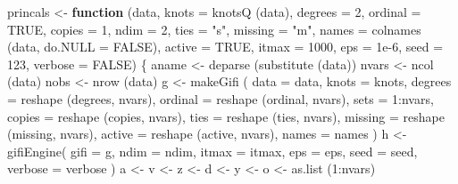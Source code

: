 \documentclass[
  12pt,
]{book}
\newenvironment{Shaded}{\begin{snugshade}}{\end{snugshade}}
\newcommand{\AttributeTok}[1]{\textcolor[rgb]{0.77,0.63,0.00}{#1}}
\newcommand{\ConstantTok}[1]{\textcolor[rgb]{0.00,0.00,0.00}{#1}}
\newcommand{\ControlFlowTok}[1]{\textcolor[rgb]{0.13,0.29,0.53}{\textbf{#1}}}
\newcommand{\DecValTok}[1]{\textcolor[rgb]{0.00,0.00,0.81}{#1}}
\newcommand{\FloatTok}[1]{\textcolor[rgb]{0.00,0.00,0.81}{#1}}
\newcommand{\FunctionTok}[1]{\textcolor[rgb]{0.00,0.00,0.00}{#1}}
\newcommand{\NormalTok}[1]{#1}
\newcommand{\OtherTok}[1]{\textcolor[rgb]{0.56,0.35,0.01}{#1}}
\newcommand{\SpecialCharTok}[1]{\textcolor[rgb]{0.00,0.00,0.00}{#1}}
\newcommand{\StringTok}[1]{\textcolor[rgb]{0.31,0.60,0.02}{#1}}
\begin{document}
\begin{Shaded}
\begin{Highlighting}[]
\NormalTok{princals }\OtherTok{\textless{}{-}}
  \ControlFlowTok{function}\NormalTok{ (data,}
            \AttributeTok{knots =} \FunctionTok{knotsQ}\NormalTok{ (data),}
            \AttributeTok{degrees =} \DecValTok{2}\NormalTok{,}
            \AttributeTok{ordinal =} \ConstantTok{TRUE}\NormalTok{,}
            \AttributeTok{copies =} \DecValTok{1}\NormalTok{,}
            \AttributeTok{ndim =} \DecValTok{2}\NormalTok{,}
            \AttributeTok{ties =} \StringTok{"s"}\NormalTok{,}
            \AttributeTok{missing =} \StringTok{"m"}\NormalTok{,}
            \AttributeTok{names =} \FunctionTok{colnames}\NormalTok{ (data, }\AttributeTok{do.NULL =} \ConstantTok{FALSE}\NormalTok{),}
            \AttributeTok{active =} \ConstantTok{TRUE}\NormalTok{,}
            \AttributeTok{itmax =} \DecValTok{1000}\NormalTok{,}
            \AttributeTok{eps =} \FloatTok{1e{-}6}\NormalTok{,}
            \AttributeTok{seed =} \DecValTok{123}\NormalTok{,}
            \AttributeTok{verbose =} \ConstantTok{FALSE}\NormalTok{)  \{}
\NormalTok{    aname }\OtherTok{\textless{}{-}} \FunctionTok{deparse}\NormalTok{ (}\FunctionTok{substitute}\NormalTok{ (data))}
\NormalTok{    nvars }\OtherTok{\textless{}{-}} \FunctionTok{ncol}\NormalTok{ (data)}
\NormalTok{    nobs }\OtherTok{\textless{}{-}} \FunctionTok{nrow}\NormalTok{ (data)}
\NormalTok{    g }\OtherTok{\textless{}{-}} \FunctionTok{makeGifi}\NormalTok{ (}
      \AttributeTok{data =}\NormalTok{ data,}
      \AttributeTok{knots =}\NormalTok{ knots,}
      \AttributeTok{degrees =} \FunctionTok{reshape}\NormalTok{ (degrees, nvars),}
      \AttributeTok{ordinal =} \FunctionTok{reshape}\NormalTok{ (ordinal, nvars),}
      \AttributeTok{sets =}  \DecValTok{1}\SpecialCharTok{:}\NormalTok{nvars,}
      \AttributeTok{copies =} \FunctionTok{reshape}\NormalTok{ (copies, nvars),}
      \AttributeTok{ties =} \FunctionTok{reshape}\NormalTok{ (ties, nvars),}
      \AttributeTok{missing =} \FunctionTok{reshape}\NormalTok{ (missing, nvars),}
      \AttributeTok{active =} \FunctionTok{reshape}\NormalTok{ (active, nvars),}
      \AttributeTok{names =}\NormalTok{ names}
\NormalTok{    )}
\NormalTok{    h }\OtherTok{\textless{}{-}} \FunctionTok{gifiEngine}\NormalTok{(}
      \AttributeTok{gifi =}\NormalTok{ g,}
      \AttributeTok{ndim =}\NormalTok{ ndim,}
      \AttributeTok{itmax =}\NormalTok{ itmax,}
      \AttributeTok{eps =}\NormalTok{ eps,}
      \AttributeTok{seed =}\NormalTok{ seed,}
      \AttributeTok{verbose =}\NormalTok{ verbose}
\NormalTok{    )}
\NormalTok{    a }\OtherTok{\textless{}{-}}\NormalTok{ v }\OtherTok{\textless{}{-}}\NormalTok{ z }\OtherTok{\textless{}{-}}\NormalTok{ d }\OtherTok{\textless{}{-}}\NormalTok{ y }\OtherTok{\textless{}{-}}\NormalTok{ o }\OtherTok{\textless{}{-}} \FunctionTok{as.list}\NormalTok{ (}\DecValTok{1}\SpecialCharTok{:}\NormalTok{nvars)}

\end{Highlighting}
\end{Shaded}
\end{document}
